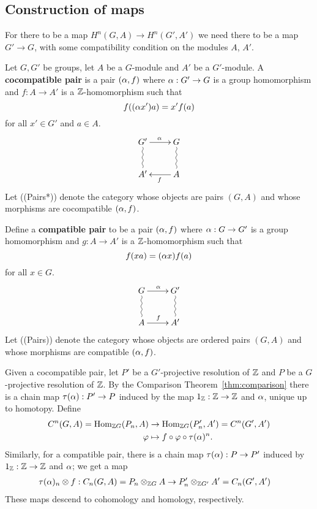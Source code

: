\subsection{Construction of maps}
For there to be a map $H^n(G,A)\to H^n(G',A')$ we need there to be a map $G'\to G$, with some compatibility condition on the modules $A$, $A'$.
\begin{df}
Let $G,G'$ be groups, let $A$ be a $G$-module and $A'$ be a $G'$-module. 
A \textbf{cocompatible pair} is a pair $(\alpha, f)$ where $\alpha:G'\to G$ is a group homomorphism and $f:A\to A'$ is a $\mathbb{Z}$-homomorphism such that
\[
f((\alpha x')a)=x'f(a)
\]
for all $x'\in G'$ and $a\in A$.
\[
\xymatrix{
G'\ar[r]^{\al} \ar@{~}[d]& G\ar@{~}[d]\\
A'& A\ar[l]^{f}
}
\]
Let ((Pairs*)) denote the category whose objects are pairs $(G,A)$ and whose morphisms are cocompatible $(\alpha,f)$.

Define a \textbf{compatible pair} to be a pair $(\alpha,f)$ where $\alpha:G\to G'$ is a group homomorphism and $g:A\to A'$ is a $\mathbb{Z}$-homomorphism such that
\[
f(xa)=(\alpha x)f(a)
\]
for all $x\in G$.
\[
\xymatrix{
G\ar[r]^{\al} \ar@{~}[d]& G'\ar@{~}[d]\\
A\ar[r]^{f}& A'
}
\]
Let ((Pairs)) denote the category whose objects are ordered pairs $(G,A)$ and whose morphisms are compatible $(\alpha,f)$.
\end{df}
Given a cocompatible pair, let $P'$ be a $G'$-projective resolution of $\mathbb{Z}$ and $P$ be a $G$-projective resolution of $\mathbb{Z}$. By the Comparison Theorem~\ref{thm:comparison} there is a chain map $\tau(\alpha): P'\to P$ induced by the map $1_{\mathbb{Z}}:\mathbb{Z}\to \mathbb{Z}$ and $\alpha$, unique up to homotopy. Define
\begin{align*}
C^n(G,A)=\operatorname{Hom}_{\mathbb{Z} G}(P_n,A)&\to \operatorname{Hom}_{\mathbb{Z} G}(P_n',A')=C^n(G',A')\\
\varphi&\mapsto f\circ \varphi \circ \tau(\alpha)^n.
\end{align*}
Similarly, for a compatible pair, there is a chain map $\tau(\alpha):P\to P'$ induced by $1_{\mathbb{Z}}:\mathbb{Z}\to \mathbb{Z}$ and $\alpha$; we get a map
\begin{align*}
\tau(\al)_n\ot f
:C_n(G,A)=P_n \ot_{\Z G} A&\to P_n'\ot_{\Z G'} A' =C_n(G',A')
 & %
\end{align*}
These maps descend to cohomology and homology, respectively.
